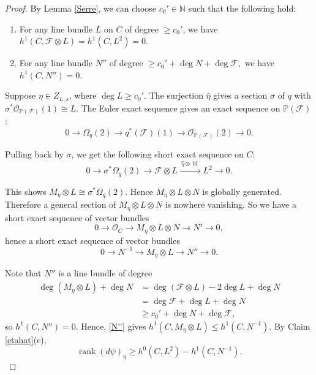 \documentclass[10pt,a4paper]{amsart}
\begin{document}
\begin{proof}
By Lemma \ref{Serre}, we can choose $c_0'\in\mathbb{N}$ such that the following hold:

\begin{enumerate}
\item For any line bundle $L$ on $C$ of degree $\ge c_0'$, we have
$h^1(C,\mathcal{F}\otimes L)=h^1(C,L^2)=0$.

\item For any line bundle $N''$ of degree $\ge c_0'+\deg N+\deg\mathcal{F},$
we have $h^1(C,N'')=0$.
\end{enumerate}



Suppose $\eta\in Z_{L,s}$, where $\deg L\ge c_0'$. The surjection
$\widehat{\eta}$ gives a section $\sigma$ of $q$ with $\sigma^*\mathcal{O}_{\mathbb{P}(\mathcal{F})}(1)\cong L$. The Euler exact sequence
gives an exact sequence on $\mathbb{P}(\mathcal{F})$:
\[
0\longrightarrow \Omega_q(2)\longrightarrow q^*(\mathcal{F})(1)\longrightarrow \mathcal{O}_{\mathbb{P}(\mathcal{F})}(2)\longrightarrow 0.
\]

Pulling back by $\sigma$, we get the following short exact sequence on $C$:
\[
0\longrightarrow \sigma^*\Omega_q(2)\longrightarrow
\mathcal{F}\otimes L
\xrightarrow{\ \widehat{\eta}\otimes\operatorname{id}\ }
L^2
\longrightarrow 0.
\]

This shows $M_\eta\otimes L\cong\sigma^*\Omega_q(2)$. Hence $M_\eta\otimes L\otimes N$ is globally generated. Therefore a general section of $M_\eta\otimes L\otimes N$ is nowhere vanishing. So we have a short exact sequence of vector bundles
\[
0\longrightarrow \mathcal{O}_C
\longrightarrow
M_\eta\otimes L\otimes N
\longrightarrow
N'
\longrightarrow 0,
\]
hence a short exact sequence of vector bundles
\begin{equation}\label{N''}
0\longrightarrow N^{-1}
\longrightarrow
M_\eta\otimes L
\longrightarrow
N''
\longrightarrow 0.
\end{equation}

Note that $N''$ is a line bundle of degree
\begin{align*}
\deg(M_\eta\otimes L)+\deg N
&=
\deg(\mathcal{F}\otimes L)-2\deg L+\deg N\\
&=
\deg\mathcal{F}+\deg L+\deg N\\
&\ge
c_0'+\deg N+\deg\mathcal{F},
\end{align*}
so $h^1(C,N'')=0$. Hence, \eqref{N''} gives
$h^1(C,M_\eta\otimes L)\le h^1(C,N^{-1})$. By Claim \ref{etahat}(c),
\[
\operatorname{rank}(d\psi)_\eta
\ge
h^0(C,L^2)-h^1(C,N^{-1}).
\]



\end{proof}
\end{document}
